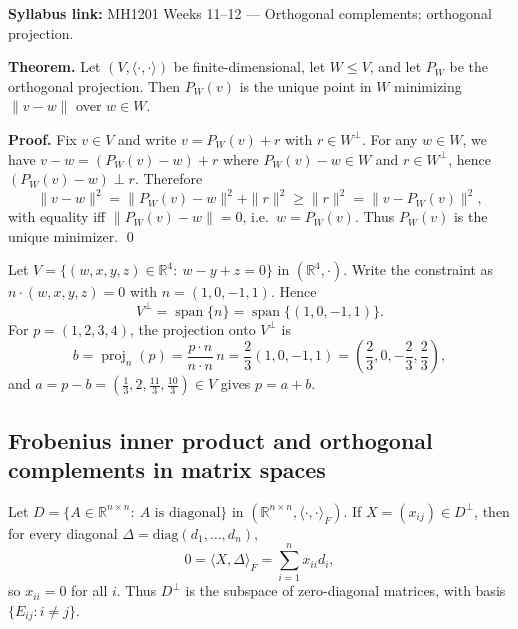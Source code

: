 \begin{extension}[title={Extension (Beyond Syllabus: projection as the unique minimizer)}]
\textbf{Syllabus link:} MH1201 Weeks 11--12 --- Orthogonal complements; orthogonal projection.

\textbf{Theorem.}
Let $(V,\langle\cdot,\cdot\rangle)$ be finite-dimensional, let $W\le V$, and let $P_W$ be the orthogonal projection.
Then $P_W(v)$ is the unique point in $W$ minimizing $\|v-w\|$ over $w\in W$.

\textbf{Proof.}
Fix $v\in V$ and write $v=P_W(v)+r$ with $r\in W^\perp$.
For any $w\in W$, we have $v-w=(P_W(v)-w)+r$ where $P_W(v)-w\in W$ and $r\in W^\perp$, hence $(P_W(v)-w)\perp r$.
Therefore
\[
\|v-w\|^2=\|P_W(v)-w\|^2+\|r\|^2\ge \|r\|^2=\|v-P_W(v)\|^2,
\]
with equality iff $\|P_W(v)-w\|=0$, i.e.\ $w=P_W(v)$. Thus $P_W(v)$ is the unique minimizer. \qed
\end{extension}

\begin{examplebox}[title={Worked Example (Tutorial 10, Question 6): $V^\perp$ for a hyperplane and orthogonal decomposition in $\mathbb{R}^4$}]
Let $V=\{(w,x,y,z)\in\mathbb{R}^4:\ w-y+z=0\}$ in $(\mathbb{R}^4,\cdot)$.
Write the constraint as $n\cdot (w,x,y,z)=0$ with $n=(1,0,-1,1)$.
Hence
\[
V^\perp=\operatorname{span}\{n\}=\operatorname{span}\{(1,0,-1,1)\}.
\]
For $p=(1,2,3,4)$, the projection onto $V^\perp$ is
\[
b=\operatorname{proj}_{n}(p)=\frac{p\cdot n}{n\cdot n}\,n
=\frac{2}{3}(1,0,-1,1)=\left(\frac23,0,-\frac23,\frac23\right),
\]
and $a=p-b=\left(\frac13,2,\frac{11}{3},\frac{10}{3}\right)\in V$ gives $p=a+b$.
\end{examplebox}

\subsection{Frobenius inner product and orthogonal complements in matrix spaces}

\begin{examplebox}[title={Worked Example (Tutorial 10, Question 7): diagonal matrices and $D^\perp$}]
Let $D=\{A\in\mathbb{R}^{n\times n}:\ A\text{ is diagonal}\}$ in $(\mathbb{R}^{n\times n},\langle\cdot,\cdot\rangle_F)$.
If $X=(x_{ij})\in D^\perp$, then for every diagonal $\Delta=\mathrm{diag}(d_1,\dots,d_n)$,
\[
0=\langle X,\Delta\rangle_F=\sum_{i=1}^n x_{ii}d_i,
\]
so $x_{ii}=0$ for all $i$. Thus $D^\perp$ is the subspace of zero-diagonal matrices, with basis $\{E_{ij}:i\neq j\}$.
\end{examplebox}

